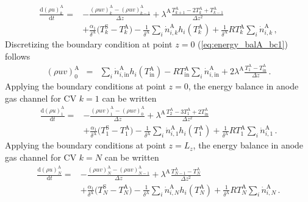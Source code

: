 \documentclass[pdftex,a4paper, 12pt]{article}
\begin{document}
%
\begin{align}
	\frac{\mathrm{d} (\rho u)_{k}^{\mathrm{A}}}{\mathrm{d} t} = &-\frac{(\rho u v)_{k}^{\mathrm{A}} 
		- (\rho u v)_{k-1}^{\mathrm{A}} }{\Delta z} 
	 + \lambda^{\mathrm{A}} \frac{T_{k+1}^{\mathrm{A}} -2T_{k}^{\mathrm{A}} +T_{k-1}^{\mathrm{A}}}{\Delta z^2} \nonumber \\ &+ \frac{\alpha_1}{\delta^{\mathrm{A}}} \big( T_{k}^{\mathrm{S}} - T_{k}^{\mathrm{A}} \big) - \frac{1}{\delta^{\mathrm{A}}} \sum_{i} \dot{n}_{i,k}^{\mathrm{A}} h_{i}(T_k^{\mathrm{A}}) + \frac{1}{\delta^{\mathrm{A}}} R T_k^{\mathrm{A}} \sum_{i} \dot{n}_{i,k}^{\mathrm{A}} \, ,
	\label{eq:energy_balA_disc}
\end{align}
%
Discretizing the boundary condition at point $z=0$ (\ref{eq:energy_balA_bc1}) follows
%
\begin{eqnarray}
	(\rho u v)_{0}^{\mathrm{A}} &=& \sum_{i} \dot{n}_{i,\mathrm{in}}^{\mathrm{A}} h_{i}(T_{\mathrm{in}}^{\mathrm{A}}) - R T_{\mathrm{in}}^{\mathrm{A}} \sum_{i} \dot{n}_{i,\mathrm{in}}^{\mathrm{A}} + 2\lambda^{\mathrm{A}} \frac{T_{1}^{\mathrm{A}} - T_{\mathrm{in}}^{\mathrm{A}}}{\Delta z}  \, .
\end{eqnarray}
%
%
Applying the boundary conditions at point $z=0$, the energy balance in anode gas channel for CV $k = 1$ can be written
%
\begin{align}
	\frac{\mathrm{d} (\rho u)_{1}^{\mathrm{A}}}{\mathrm{d} t} = & -\frac{(\rho u v)_{1}^{\mathrm{A}} 
	- (\rho u v)_{0}^{\mathrm{A}} }{\Delta z}
	+ \lambda^{\mathrm{A}} \frac{T_{2}^{\mathrm{A}} - 3 T_{1}^{\mathrm{A}} +2 T_{\mathrm{in}}^{\mathrm{A}}}{\Delta z^2}  \nonumber \\ &+ \frac{\alpha_1}{\delta^{\mathrm{A}}} \big( T_{1}^{\mathrm{S}} - T_{1}^{\mathrm{A}} \big) - \frac{1}{\delta^{\mathrm{A}}} \sum_{i} \dot{n}_{i,1}^{\mathrm{A}} h_{i}(T_1^{\mathrm{A}}) + \frac{1}{\delta^{\mathrm{A}}} R T_1^{\mathrm{A}} \sum_{i} \dot{n}_{i,1}^{\mathrm{A}} \, .
	\label{eq:energy_balA_disc1}
\end{align}
%
Applying the boundary conditions at point $z=L_{z}$, the energy balance in anode gas channel for CV $k = N$ can be written
%
\begin{align}
	\frac{\mathrm{d} (\rho u)_{N}^{\mathrm{A}}}{\mathrm{d} t} = & - \frac{(\rho u v)_{N}^{\mathrm{A}} 
	- (\rho u v)_{N-1}^{\mathrm{A}} }{\Delta z}
	+ \lambda^{\mathrm{A}} \frac{T_{N-1}^{\mathrm{A}} - T_{N}^{\mathrm{A}}}{\Delta z^2}  \nonumber \\ &+ \frac{\alpha_1}{\delta^{\mathrm{A}}} \big( T_{N}^{\mathrm{S}} - T_{N}^{\mathrm{A}} \big) - \frac{1}{\delta^{\mathrm{A}}} \sum_{i} \dot{n}_{i,N}^{\mathrm{A}} h_{i}(T_N^{\mathrm{A}}) + \frac{1}{\delta^{\mathrm{A}}} R T_N^{\mathrm{A}} \sum_{i} \dot{n}_{i,N}^{\mathrm{A}} \, .
	\label{eq:energy_balA_discN}
\end{align}
%
\end{document}
